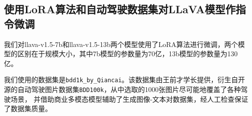 \documentclass[
    linespread = 1.25
]{ctexart}
\begin{document}



\subsection{使用LoRA算法和自动驾驶数据集对LLaVA模型作指令微调}
我们对llava-v1.5-7b和llava-v1.5-13b两个模型使用了LoRA算法进行微调，两个模型的区别在于规模大小，其中7b模型的参数量为70亿，13b模型的参数量为130亿。

我们使用的数据集是\texttt{bdd1k\_by\_Qiancai}。该数据集由王前才学长提供，衍生自开源的自动驾驶图片数据集\texttt{BDD100k}\cite{yu2020bdd100kdiversedrivingdataset}，从中选取的1000张图片尽可能地覆盖了各种驾驶场景，
并借助商业多模态模型辅助了生成图像-文本对数据集，经人工检查保证了数据集质量。
\end{document}
